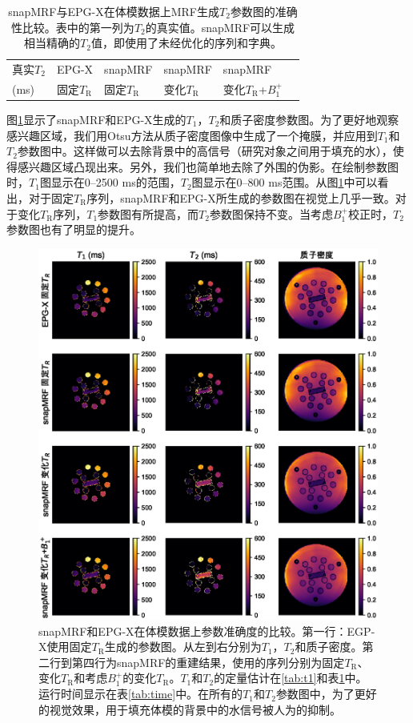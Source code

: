 \begin{table}
\caption{snapMRF与EPG-X在体模数据上MRF生成$T_2$参数图的准确性比较。表中的第一列为$T_2$的真实值。snapMRF可以生成相当精确的$T_2$值，即使用了未经优化的序列和字典。}
\centering
\label{tab:t2}
\begin{tabular}{|l|l|l|l|l|l|}
\hline
\hline
真实$T_2$ & EPG-X & snapMRF & snapMRF & snapMRF\\ 
(ms) & 固定$T_\mathrm{R}$ & 固定$T_\mathrm{R}$ & 变化$T_\mathrm{R}$ & 变化$T_\mathrm{R}$+$B_1^+$\\
\hline

\hline
\end{tabular}
\end{table}

图\ref{fig:phantom}显示了snapMRF和EPG-X生成的$T_1$，$T_2$和质子密度参数图。为了更好地观察感兴趣区域，我们用Otsu方法从质子密度图像中生成了一个掩膜，并应用到$T_1$和$T_2$参数图中。这样做可以去除背景中的高信号（研究对象之间用于填充的水），使得感兴趣区域凸现出来。另外，我们也简单地去除了外围的伪影。在绘制参数图时，$T_1$图显示在0--2500 ms的范围，$T_2$图显示在0--800 ms范围。从图\ref{fig:phantom}中可以看出，对于固定$T_\mathrm{R}$序列，snapMRF和EPG-X所生成的参数图在视觉上几乎一致。对于变化$T_\mathrm{R}$序列，$T_1$参数图有所提高，而$T_2$参数图保持不变。当考虑$B_1^+$校正时，$T_2$参数图也有了明显的提升。

\begin{figure}[htbp]
\centerline{\includegraphics[width=1\textwidth]{img/snapmrf/figure2.eps}}
\caption{snapMRF和EPG-X在体模数据上参数准确度的比较。第一行：EGP-X使用固定$T_\mathrm{R}$生成的参数图。从左到右分别为$T_1$，$T_2$和质子密度。第二行到第四行为snapMRF的重建结果，使用的序列分别为固定$T_\mathrm{R}$、变化$T_\mathrm{R}$和考虑$B_1^+$的变化$T_\mathrm{R}$。$T_1$和$T_2$的定量估计在\ref{tab:t1}和表\ref{tab:t2}中。运行时间显示在表\ref{tab:time}中。在所有的$T_1$和$T_2$参数图中，为了更好的视觉效果，用于填充体模的背景中的水信号被人为的抑制。
}
\label{fig:phantom}
\end{figure}

